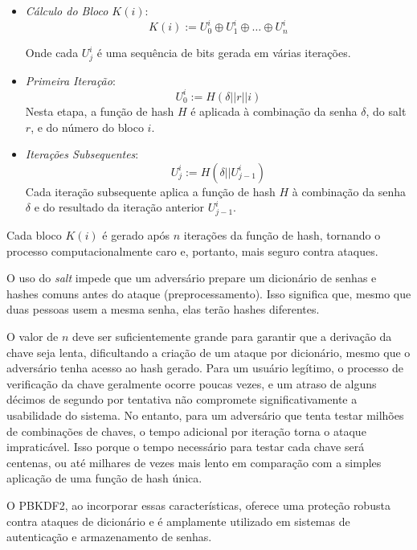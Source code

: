 \begin{itemize}
    \item[] {\em Cálculo do Bloco $K(i)$}:
    \begin{displaymath}
    K(i) := U_0^i \oplus U_1^i \oplus \dots \oplus U_n^i
    \end{displaymath}
    
    Onde cada $U_j^i$ é uma sequência de bits gerada em várias iterações.

    \item[] {\em Primeira Iteração}:
    \begin{displaymath}
    U_0^i := H(\delta || r || i)
    \end{displaymath}
    Nesta etapa, a função de hash $H$ é aplicada à combinação da senha $\delta$, do salt $r$, e do número do bloco $i$.

    \item[] {\em Iterações Subsequentes}:
    \begin{displaymath}
    U_j^i := H(\delta || U_{j-1}^i)
    \end{displaymath}
    Cada iteração subsequente aplica a função de hash $H$ à combinação da senha $\delta$ e do resultado da iteração anterior $U_{j-1}^i$.
\end{itemize}

Cada bloco $K(i)$ é gerado após $n$ iterações da função de hash, tornando o processo computacionalmente caro e, portanto, mais seguro contra ataques.

O uso do {\em salt} impede que um adversário prepare um dicionário de senhas e hashes comuns antes do ataque (preprocessamento).
Isso significa que, mesmo que duas pessoas usem a mesma senha, elas terão hashes diferentes.

O valor de $n$ deve ser suficientemente grande para garantir que a derivação da chave seja lenta, dificultando a criação de um ataque por dicionário, mesmo que o adversário tenha acesso ao hash gerado.
Para um usuário legítimo, o processo de verificação da chave geralmente ocorre poucas vezes, e um atraso de alguns décimos de segundo por tentativa não compromete significativamente a usabilidade do sistema.
No entanto, para um adversário que tenta testar milhões de combinações de chaves, o tempo adicional por iteração torna o ataque impraticável.
Isso porque o tempo necessário para testar cada chave será centenas, ou até milhares de vezes mais lento em comparação com a simples aplicação de uma função de hash única.

O PBKDF2, ao incorporar essas características, oferece uma proteção robusta contra ataques de dicionário e é amplamente utilizado em sistemas de autenticação e armazenamento de senhas.

